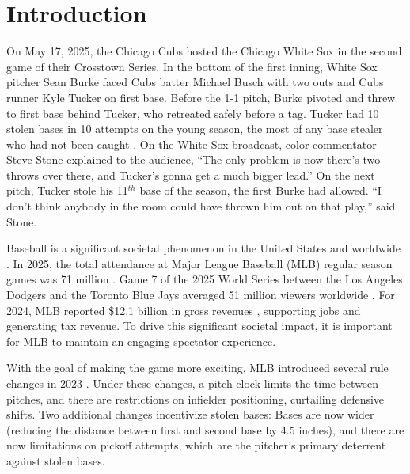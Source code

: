 \documentclass[opre,dblanonrev]{informs4}
\begin{document}

 \maketitle

 \section{Introduction}
  \label{sec:introduction}
    On May 17, 2025, the Chicago Cubs hosted the Chicago White Sox in the second game of their Crosstown Series. In the bottom of the first inning, White Sox pitcher Sean Burke faced Cubs batter Michael Busch with two outs and Cubs runner Kyle Tucker on first base. Before the 1-1 pitch, Burke pivoted and threw to first base behind Tucker, who retreated safely before a tag. Tucker had 10 stolen bases in 10 attempts on the young season, the most of any base stealer who had not been caught \citep{fangraphs_major_2025}. On the White Sox broadcast, color commentator Steve Stone explained to the audience, ``The only problem is now there's two throws over there, and Tucker's gonna get a much bigger lead.'' On the next pitch, Tucker stole his 11$^{th}$ base of the season, the first Burke had allowed. ``I don't think anybody in the room could have thrown him out on that play,'' said Stone.

    Baseball is a significant societal phenomenon in the United States and worldwide \citep{kelly_is_2007}. In 2025, the total attendance at Major League Baseball (MLB) regular season games was 71 million \citep{baseball_reference_2025_2025}. Game 7 of the 2025 World Series between the Los Angeles Dodgers and the Toronto Blue Jays averaged 51 million viewers worldwide \citep{mlb_51_2025}. For 2024, MLB reported \$12.1 billion in gross revenues \citep{brown_mlb_2025}, supporting jobs and generating tax revenue. To drive this significant societal impact, it is important for MLB to maintain an engaging spectator experience.

    With the goal of making the game more exciting, MLB introduced several rule changes in 2023 \citep{castrovince_pitch_2023}. Under these changes, a pitch clock limits the time between pitches, and there are restrictions on infielder positioning, curtailing defensive shifts. Two additional changes incentivize stolen bases: Bases are now wider (reducing the distance between first and second base by 4.5 inches), and there are now limitations on pickoff attempts, which are the pitcher's primary deterrent against stolen bases.
\end{document}

